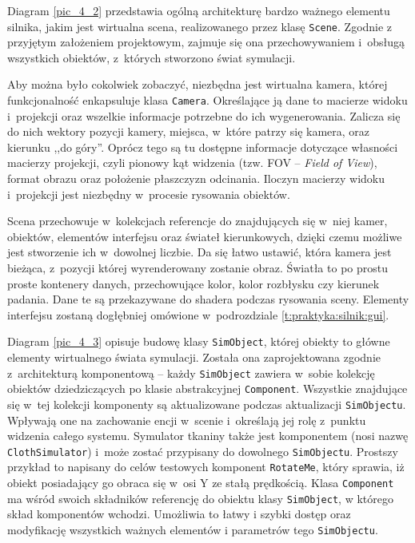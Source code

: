 		
		
		Diagram \ref{pic_4_2} przedstawia ogólną architekturę bardzo ważnego elementu silnika, jakim jest wirtualna scena, realizowanego przez klasę \texttt{Scene}. Zgodnie z przyjętym założeniem projektowym, zajmuje się ona przechowywaniem i~obsługą wszystkich obiektów, z~których stworzono świat symulacji. 
		
		Aby można było cokolwiek zobaczyć, niezbędna jest wirtualna kamera, której funkcjonalność enkapsuluje klasa \texttt{Camera}. Określające ją dane to macierze widoku i~projekcji oraz wszelkie informacje potrzebne do ich wygenerowania. Zalicza się do nich wektory pozycji kamery, miejsca, w~które patrzy się kamera, oraz kierunku ,,do góry''. Oprócz tego są tu dostępne informacje dotyczące własności macierzy projekcji, czyli pionowy kąt widzenia (tzw. FOV -- \emph{Field of View}), format obrazu oraz położenie płaszczyzn odcinania. Iloczyn macierzy widoku i~projekcji jest niezbędny w~procesie rysowania obiektów.
		
		Scena przechowuje w~kolekcjach referencje do znajdujących się w~niej kamer, obiektów, elementów interfejsu oraz świateł kierunkowych, dzięki czemu możliwe jest stworzenie ich w~dowolnej liczbie. Da się łatwo ustawić, która kamera jest bieżąca, z~pozycji której wyrenderowany zostanie obraz. Światła to po prostu proste kontenery danych, przechowujące kolor, kolor rozbłysku czy kierunek padania. Dane te są przekazywane do shadera podczas rysowania sceny. Elementy interfejsu zostaną dogłębniej omówione w~podrozdziale \ref{t:praktyka:silnik:gui}.
		
		
		Diagram \ref{pic_4_3} opisuje budowę klasy \texttt{SimObject}, której obiekty to główne elementy wirtualnego świata symulacji. Została ona zaprojektowana zgodnie z~architekturą komponentową -- każdy \texttt{SimObject} zawiera w~sobie kolekcję obiektów dziedziczących po klasie abstrakcyjnej \texttt{Component}. Wszystkie znajdujące się w~tej kolekcji komponenty są aktualizowane podczas aktualizacji \texttt{SimObjectu}. Wpływają one na zachowanie encji w~scenie i~określają jej rolę z~punktu widzenia całego systemu. Symulator tkaniny także jest komponentem (nosi nazwę \texttt{ClothSimulator}) i~może zostać przypisany do dowolnego \texttt{SimObjectu}. Prostszy przykład to napisany do celów testowych komponent \texttt{RotateMe}, który sprawia, iż obiekt posiadający go obraca się w~osi Y ze stałą prędkością. Klasa \texttt{Component} ma wśród swoich składników referencję do obiektu klasy \texttt{SimObject}, w którego skład komponentów wchodzi. Umożliwia to łatwy i szybki dostęp oraz modyfikację wszystkich ważnych elementów i parametrów tego \texttt{SimObjectu}.
		

